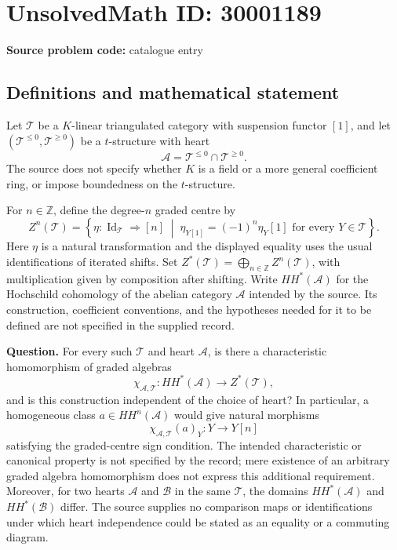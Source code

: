 \documentclass[11pt]{article}
\newcommand{\Z}{\mathbb{Z}}
\begin{document}
\section*{UnsolvedMath ID: 30001189}
\textbf{Source problem code:} catalogue entry
\subsection{Definitions and mathematical statement}
Let \(\mathcal T\) be a \(K\)-linear triangulated category with suspension functor \([1]\), and let \((\mathcal T^{\leq 0},\mathcal T^{\geq 0})\) be a \(t\)-structure with heart
\[
\mathcal A=\mathcal T^{\leq 0}\cap\mathcal T^{\geq 0}.
\]
The source does not specify whether \(K\) is a field or a more general coefficient ring, or impose boundedness on the \(t\)-structure.

For \(n\in\Z\), define the degree-\(n\) graded centre by
\[
Z^n(\mathcal T)=\left\{\eta:\operatorname{Id}_{\mathcal T}\Rightarrow[n]\;\middle|\;\eta_{Y[1]}=(-1)^n\eta_Y[1]\text{ for every }Y\in\mathcal T\right\}.
\]
Here \(\eta\) is a natural transformation and the displayed equality uses the usual identifications of iterated shifts. Set \(Z^*(\mathcal T)=\bigoplus_{n\in\Z}Z^n(\mathcal T)\), with multiplication given by composition after shifting. Write \(HH^*(\mathcal A)\) for the Hochschild cohomology of the abelian category \(\mathcal A\) intended by the source. Its construction, coefficient conventions, and the hypotheses needed for it to be defined are not specified in the supplied record.

\textbf{Question.} For every such \(\mathcal T\) and heart \(\mathcal A\), is there a characteristic homomorphism of graded algebras
\[
\chi_{\mathcal A,\mathcal T}:HH^*(\mathcal A)\longrightarrow Z^*(\mathcal T),
\]
and is this construction independent of the choice of heart? In particular, a homogeneous class \(a\in HH^n(\mathcal A)\) would give natural morphisms
\[
\chi_{\mathcal A,\mathcal T}(a)_Y:Y\longrightarrow Y[n]
\]
satisfying the graded-centre sign condition. The intended characteristic or canonical property is not specified by the record; mere existence of an arbitrary graded algebra homomorphism does not express this additional requirement. Moreover, for two hearts \(\mathcal A\) and \(\mathcal B\) in the same \(\mathcal T\), the domains \(HH^*(\mathcal A)\) and \(HH^*(\mathcal B)\) differ. The source supplies no comparison maps or identifications under which heart independence could be stated as an equality or a commuting diagram.
\end{document}
